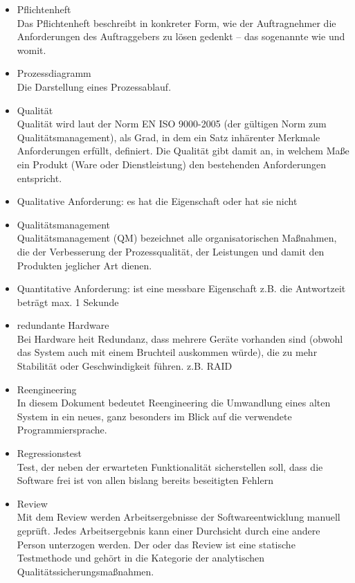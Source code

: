 \begin{itemize}
\item 	Pflichtenheft\\Das Pflichtenheft beschreibt in konkreter Form, wie der Auftragnehmer die Anforderungen des Auftraggebers zu lösen gedenkt – das sogenannte wie und womit.
\item 	Prozessdiagramm\\Die Darstellung eines Prozessablauf.
\item 	Qualität\\
Qualität wird laut der Norm EN ISO 9000-2005 (der gültigen Norm zum Qualitätsmanagement), als Grad, in dem ein Satz inhärenter Merkmale Anforderungen erfüllt, definiert. Die Qualität gibt damit an, in welchem Maße ein Produkt (Ware oder Dienstleistung) den bestehenden Anforderungen entspricht.
\item 	Qualitative Anforderung: es hat die Eigenschaft oder hat sie nicht
\item 	Qualitätsmanagement\\
Qualitätsmanagement (QM) bezeichnet alle organisatorischen Maßnahmen, die der Verbesserung der Prozessqualität, der Leistungen und damit den Produkten jeglicher Art dienen. 
\item 	Quantitative Anforderung: ist eine messbare Eigenschaft z.B. die Antwortzeit beträgt max. 1 Sekunde
\item 	redundante Hardware\\
Bei Hardware heit Redundanz, dass mehrere Geräte vorhanden sind (obwohl das System auch mit einem Bruchteil auskommen würde), die zu mehr Stabilität oder Geschwindigkeit führen. z.B. RAID
\item 	Reengineering\\
In diesem Dokument bedeutet Reengineering die Umwandlung eines alten System in ein neues, ganz besonders im Blick auf die verwendete Programmiersprache.
\item 	Regressionstest \\
Test, der neben der erwarteten Funktionalität sicherstellen soll, dass die Software frei ist von allen bislang bereits beseitigten Fehlern
\item 	Review\\
Mit dem Review werden Arbeitsergebnisse der Softwareentwicklung manuell geprüft. Jedes Arbeitsergebnis kann einer Durchsicht durch eine andere Person unterzogen werden. Der oder das Review ist eine statische Testmethode und gehört in die Kategorie der analytischen Qualitätssicherungsmaßnahmen.


\end{itemize}
